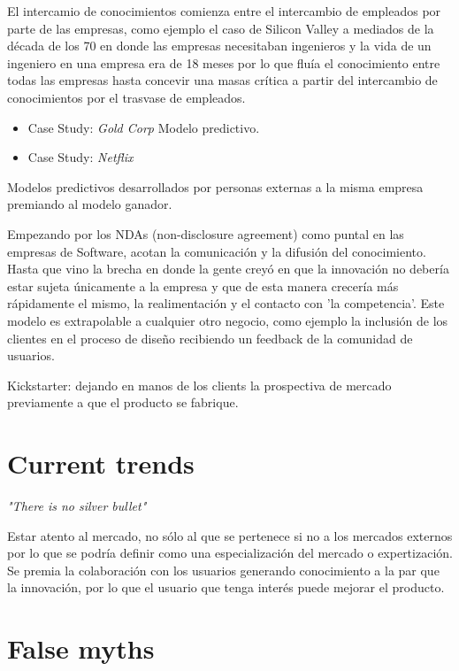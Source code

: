 El intercamio de conocimientos comienza entre el intercambio de empleados por parte de las empresas, como ejemplo el caso de Silicon Valley a mediados de la década de los 70 en donde las empresas necesitaban ingenieros y la vida de un ingeniero en una empresa era de 18 meses por lo que fluía el conocimiento entre todas las empresas hasta concevir una masas crítica a partir del intercambio de conocimientos por el trasvase de empleados.

\begin{itemize}
  \item Case Study: \emph{Gold Corp} Modelo predictivo.
  \item Case Study: \emph{Netflix}
\end{itemize}

Modelos predictivos desarrollados por personas externas a la misma empresa premiando al modelo ganador.

Empezando por los NDAs (non-disclosure agreement) como puntal en las empresas de Software, acotan la comunicación y la difusión del conocimiento. Hasta que vino la brecha en donde la gente creyó en que la innovación no debería estar sujeta únicamente a la empresa y que de esta manera crecería más rápidamente el mismo, la realimentación y el contacto con 'la competencia'. Este modelo es extrapolable a cualquier otro negocio, como ejemplo la inclusión de los clientes en el proceso de diseño recibiendo un feedback de la comunidad de usuarios.

Kickstarter: dejando en manos de los clients la prospectiva de mercado previamente a que el producto se fabrique.

\section{Current trends}\label{lesson-4-current-trends}

\emph{"There is no silver bullet"}

Estar atento al mercado, no sólo al que se pertenece si no a los mercados externos por lo que se podría definir como una especialización del mercado o expertización. Se premia la colaboración con los usuarios generando conocimiento a la par que la innovación, por lo que el usuario que tenga interés puede mejorar el producto.

\section{False myths}\label{lesson-4-false-myths}

